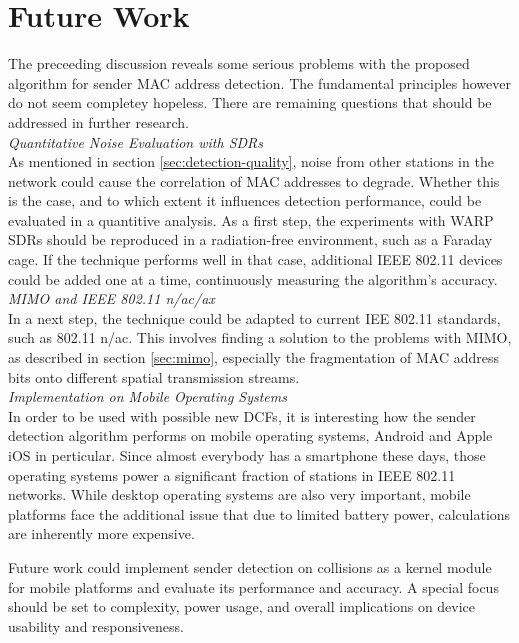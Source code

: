 
\section{Future Work}

The preceeding discussion reveals some serious problems with the proposed algorithm for sender MAC address detection. The fundamental principles however do not seem completey hopeless. There are remaining questions that should be addressed in further research.\\

\textit{Quantitative Noise Evaluation with SDRs}\\

As mentioned in section \ref{sec:detection-quality}, noise from other stations in the network could cause the correlation of MAC addresses to degrade. Whether this is the case, and to which extent it influences detection performance, could be evaluated in a quantitive analysis. As a first step, the experiments with \gls{WARP} \glspl{SDR} should be reproduced in a radiation-free environment, such as a Faraday cage. If the technique performs well in that case, additional IEEE 802.11 devices could be added one at a time, continuously measuring the algorithm's accuracy.\\

\textit{MIMO and IEEE 802.11 n/ac/ax}\\

In a next step, the technique could be adapted to current IEE 802.11 standards, such as 802.11 n/ac. This involves finding a solution to the problems with \gls{MIMO}, as described in section \ref{sec:mimo}, especially the fragmentation of MAC address bits onto different spatial transmission streams.\\

\textit{Implementation on Mobile Operating Systems}\\

In order to be used with possible new \glspl{DCF}, it is interesting how the sender detection algorithm performs on mobile operating systems, Android and Apple iOS in perticular. Since almost everybody has a smartphone these days, those operating systems power a significant fraction of stations in IEEE 802.11 networks. While desktop operating systems are also very important, mobile platforms face the additional issue that due to limited battery power, calculations are inherently more expensive.

Future work could implement sender detection on collisions as a kernel module for mobile platforms and evaluate its performance and accuracy. A special focus should be set to complexity, power usage, and overall implications on device usability and responsiveness.
